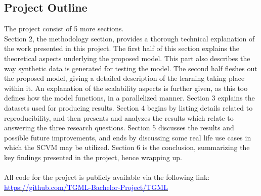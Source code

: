 \subsection{Project Outline}
\label{sec:Intro:ThesisOutline}
The project consist of 5 more sections.
\\
Section 2, the methodology section, provides a thorough technical explanation of the work presented in this project.
The first half of this section explains the theoretical aspects underlying the proposed model.
This part also describes the way synthetic data is generated for testing the model.
The second half fleshes out the proposed model, giving a detailed description of the learning taking place within it.
An explanation of the scalability aspects is further given, as this too defines how the model functions, in a parallelized manner.
Section 3 explains the datasets used for producing results.
Section 4 begins by listing details related to reproducibility, and then presents and analyzes the results which relate to answering the three research questions.
Section 5 discusses the results and possible future improvements, and ends by discussing some real life use cases in which the SCVM may be utilized.
Section 6 is the conclusion, summarizing the key findings presented in the project, hence wrapping up.
\\\\
All code for the project is publicly available via the following link:
\\
\href{https://github.com/TGML-Bachelor-Project/TGML}{\textcolor{blue}{https://github.com/TGML-Bachelor-Project/TGML}}





